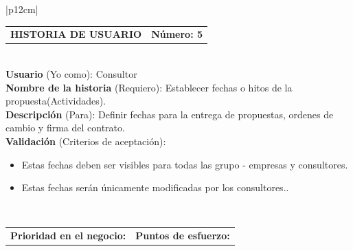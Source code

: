 \documentclass[11pt,letterpaper]{report}
\begin{document}
		\begin{center}	
			\begin{tabular}{|p{12cm}|}
				\hline
				\begin{tabular}{c|c}
					\textbf{HISTORIA DE USUARIO} & \textbf{Número: 5} \\
				\end{tabular} \\ \hline
				\textbf{Usuario} (Yo como): Consultor \\ \hline
				\textbf{Nombre de la historia} (Requiero): Establecer fechas o hitos de la propuesta(Actividades). \\ \hline
				\textbf{Descripción} (Para): Definir fechas para la entrega de propuestas, ordenes de cambio y firma del contrato. \\ \hline
				\textbf{Validación} (Criterios de aceptación): \\
				\begin{minipage}{12cm}
					\begin{itemize}
						\item Estas fechas deben ser visibles para todas las grupo - empresas y consultores.
						\item Estas fechas serán únicamente modificadas por los consultores..
					\end{itemize}
				\end{minipage} \\ \hline
				\begin{tabular}{c|c}
					\textbf{Prioridad en el negocio: } & \textbf{Puntos de esfuerzo: } \\
				\end{tabular} \\ \hline
			\end{tabular}
		\end{center}
	
\end{document}
